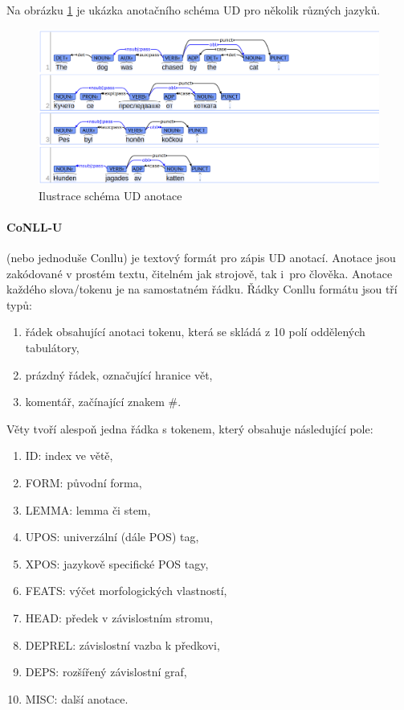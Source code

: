 \documentclass[thesis=M,czech]{FITthesis}[2019/12/23]
\begin{document}
Na obrázku \ref{fig:udscheme} je ukázka anotačního schéma UD pro několik různých jazyků.

\begin{figure}\centering
	\includegraphics[width=1\textwidth]{images/ud_scheme.png}
	\caption{Ilustrace schéma UD anotace\cite{UDweb}}\label{fig:udscheme}
\end{figure}

\paragraph{CoNLL-U}
(nebo jednoduše Conllu) je textový formát pro zápis UD anotací\cite{UDweb}. Anotace jsou zakódované v prostém textu, čitelném jak strojově, tak i~pro člověka. Anotace každého slova/tokenu je na samostatném řádku. Řádky Conllu formátu jsou tří typů:
\begin{enumerate}
    \item řádek obsahující anotaci tokenu, která se skládá z 10 polí oddělených tabulátory,
    \item prázdný řádek, označující hranice vět,
    \item komentář, začínající znakem \#.
\end{enumerate}
\newpage

Věty tvoří alespoň jedna řádka s tokenem, který obsahuje následující pole:
\begin{enumerate}
    \item ID: index ve větě,
    \item FORM: původní forma,
    \item LEMMA: lemma či stem,
    \item UPOS: univerzální  (dále POS) tag,
    \item XPOS: jazykově specifické POS tagy,
    \item FEATS: výčet morfologických vlastností,
    \item HEAD: předek v závislostním stromu,
    \item DEPREL: závislostní vazba k předkovi,
    \item DEPS: rozšířený závislostní graf,
    \item MISC: další anotace.
\end{enumerate}
\end{document}
